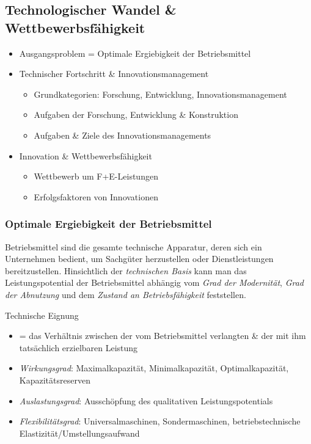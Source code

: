 \documentclass[11pt]{article}
\begin{document}
\subsection{Technologischer Wandel \& Wettbewerbsfähigkeit}
\label{sec:orgc92a881}
\begin{itemize}
\item Ausgangsproblem = Optimale Ergiebigkeit der Betriebsmittel
\item Technischer Fortschritt \& Innovationsmanagement
\begin{itemize}
\item Grundkategorien: Forschung, Entwicklung, Innovationsmanagement
\item Aufgaben der Forschung, Entwicklung \& Konstruktion
\item Aufgaben \& Ziele des Innovationsmanagements
\end{itemize}
\item Innovation \& Wettbewerbsfähigkeit
\begin{itemize}
\item Wettbewerb um F+E-Leistungen
\item Erfolgsfaktoren von Innovationen
\end{itemize}
\end{itemize}

\subsubsection{Optimale Ergiebigkeit der Betriebsmittel}
\label{sec:org6acb09c}
Betriebsmittel sind die gesamte technische Apparatur, deren sich ein Unternehmen bedient, um Sachgüter herzustellen oder Dienstleistungen bereitzustellen. Hinsichtlich der \emph{technischen Basis} kann man das Leistungspotential der Betriebsmittel abhängig vom \emph{Grad der Modernität}, \emph{Grad der Abnutzung} und dem \emph{Zustand an Betriebsfähigkeit} feststellen.

Technische Eignung 
\begin{itemize}
\item = das Verhältnis zwischen der vom Betriebsmittel verlangten \& der mit ihm tatsächlich erzielbaren Leistung
\item \emph{Wirkungsgrad}: Maximalkapazität, Minimalkapazität, Optimalkapazität, Kapazitätsreserven
\item \emph{Auslastungsgrad}: Ausschöpfung des qualitativen Leistungspotentials
\item \emph{Flexibilitätsgrad}: Universalmaschinen, Sondermaschinen, betriebstechnische Elastizität/Umstellungsaufwand
\end{itemize}
\end{document}
